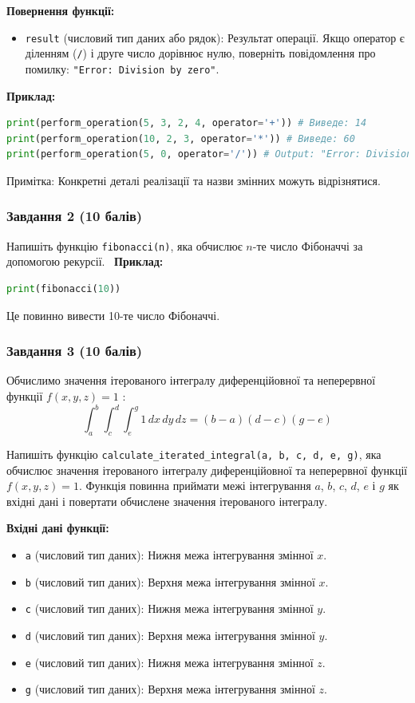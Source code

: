 \documentclass[12pt]{article}
\begin{document}
\textbf{Повернення функції:}
\begin{itemize}
\item \texttt{result} (числовий тип даних або рядок): Результат операції. Якщо оператор є діленням (\texttt{/}) і друге число дорівнює нулю, поверніть повідомлення про помилку: \texttt{"Error: Division by zero"}.
\end{itemize}

\textbf{Приклад:}
\begin{lstlisting}[language=Python]
print(perform_operation(5, 3, 2, 4, operator='+')) # Виведе: 14
print(perform_operation(10, 2, 3, operator='*')) # Виведе: 60
print(perform_operation(5, 0, operator='/')) # Output: "Error: Division by zero"
\end{lstlisting}

Примітка: Конкретні деталі реалізації та назви змінних можуть відрізнятися.

\subsubsection{Завдання 2 (10 балів)}
Напишіть функцію \texttt{fibonacci(n)}, яка обчислює $n$-те число Фібоначчі за допомогою рекурсії. \
\textbf{Приклад:}
\begin{lstlisting}[language=Python]
print(fibonacci(10))
\end{lstlisting}
Це повинно вивести 10-те число Фібоначчі.

\subsubsection{Завдання 3 (10 балів)}

Обчислимо значення ітерованого інтегралу диференційовної та неперервної функції $f(x,y,z) = 1$ :
\[
\int_a^b \int_c^d \int_e^g 1 \, dx \, dy \, dz = (b - a)(d - c)(g - e)
\]


Напишіть функцію \texttt{calculate\_iterated\_integral(a, b, c, d, e, g)}, яка обчислює значення ітерованого інтегралу диференційовної та неперервної функції $f(x,y,z) = 1$. Функція повинна приймати межі інтегрування $a$, $b$, $c$, $d$, $e$ і $g$ як вхідні дані і повертати обчислене значення ітерованого інтегралу.

\textbf{Вхідні дані функції:}
\begin{itemize}
\item \texttt{a} (числовий тип даних): Нижня межа інтегрування змінної $x$.
\item \texttt{b} (числовий тип даних): Верхня межа інтегрування змінної $x$.
\item \texttt{c} (числовий тип даних): Нижня межа інтегрування змінної $y$.
\item \texttt{d} (числовий тип даних): Верхня межа інтегрування змінної $y$.
\item \texttt{e} (числовий тип даних): Нижня межа інтегрування змінної $z$.
\item \texttt{g} (числовий тип даних): Верхня межа інтегрування змінної $z$.
\end{itemize}
\end{document}
